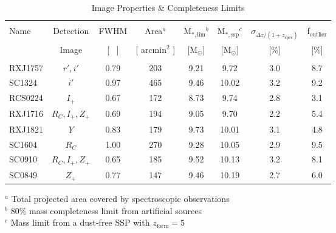 \documentclass[a4paper,fleqn,usenatbib]{mnras}
\begin{document}
\begin{table*}
	\begin{center}
	\caption{Image Properties \& Completeness Limits}
	\label{tab:masslim}

	\begin{tabular}{lccccccc}

	\hline \\[-5mm]  
	\hline \\[-3mm]  

	Name & Detection & FWHM & Area$^a$ & M$_{\mathrm{*, lim}}$$^b$ & M$_{\mathrm{*, ssp}}$$^c$ & $\sigma_{\Delta z / (1 + z_{\mathrm{spec}})}$ & f$_{\mathrm{outlier}}$ \\
	 & Image & [ \arcsec\ ] & [ arcmin$^2$ ] & [M$_{\odot}$] & [M$_{\odot}$] & [\%] & [\%] \\[0.5mm]

	\hline \\[-2mm]

	RXJ1757   &  $r', i'$         &  0.79  &  203  &   9.21   &   9.72    &   3.0   &   8.7  \\
	SC1324    &  $i'$             &  0.97  &  465  &   9.46   &   10.02   &   3.2   &   9.2  \\
	RCS0224   &  $I_+$            &  0.67  &  172  &   8.73   &   9.74    &   2.8   &   3.1  \\
	RXJ1716   &  $R_C, I_+, Z_+$  &  0.69  &  194  &   9.05   &   9.70    &   2.2   &   5.4  \\
	RXJ1821   &  $Y$              &  0.83  &  179  &   9.73   &   10.01   &   3.1   &   4.8  \\
	SC1604    &  $R_C$            &  1.00  &  270  &   9.28   &   10.05   &   2.9   &   9.5  \\
	SC0910    &  $R_C, I_+, Z_+$  &  0.65  &  185  &   9.52   &   10.13   &   3.2   &   8.1  \\
	SC0849    &  $Z_+$            &  0.77  &  147  &   9.46   &   10.19   &   2.7   &   6.0  \\[0mm]
	\hline

	\end{tabular}
	\end{center}

	$^a$ Total projected area covered by spectroscopic observations \\
	$^b$ 80\% mass completeness limit from artificial sources \\
	$^c$ Mass limit from a dust-free SSP with $z_{\mathrm{form}} = 5$\\
\end{table*}
\end{document}
